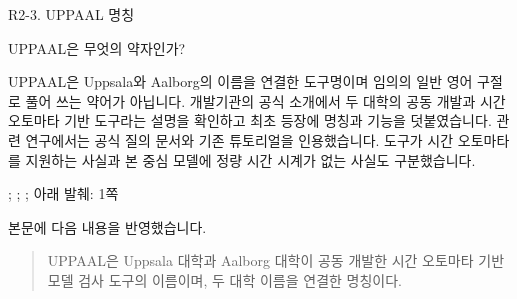 \begin{reviewitem}{R2-3. UPPAAL 명칭}

\begin{reviewercomment}

UPPAAL은 무엇의 약자인가?

\end{reviewercomment}

\begin{authorresponse}

UPPAAL은 Uppsala와 Aalborg의 이름을 연결한 도구명이며 임의의 일반 영어 구절로 풀어 쓰는 약어가 아닙니다. 개발기관의 공식 소개에서 두 대학의 공동 개발과 시간 오토마타 기반 도구라는 설명을 확인하고 최초 등장에 명칭과 기능을 덧붙였습니다. 관련 연구에서는 공식 질의 문서와 기존 튜토리얼을 인용했습니다. 도구가 시간 오토마타를 지원하는 사실과 본 중심 모델에 정량 시간 시계가 없는 사실도 구분했습니다.

\end{authorresponse}

\begin{manuscriptrevision}{; ; ; 아래 발췌: 1쪽}

본문에 다음 내용을 반영했습니다.

\begin{quote}

UPPAAL은 Uppsala 대학과 Aalborg 대학이 공동 개발한 시간 오토마타 기반 모델 검사 도구의 이름이며, 두 대학 이름을 연결한 명칭이다.

\end{quote}

\end{manuscriptrevision}

\end{reviewitem}

\clearpage


